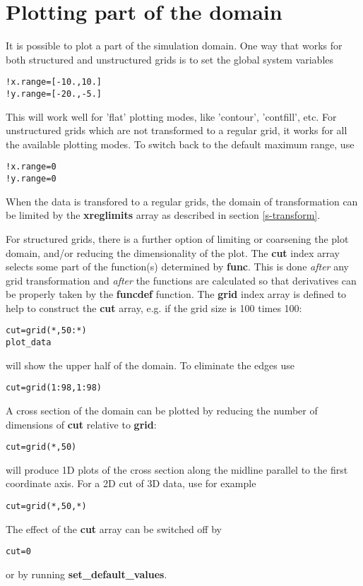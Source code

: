 \documentclass{article}
\begin{document}
\section{Plotting part of the domain \label{s-plot-part}}

It is possible to plot a part of the simulation domain.
One way that works for both structured and unstructured grids is
to set the global system variables
\begin{verbatim}
!x.range=[-10.,10.]
!y.range=[-20.,-5.]
\end{verbatim}
This will work well for 'flat' plotting modes, like 'contour',
'contfill', etc. For unstructured grids which are not transformed
to a regular grid, it works for all the available plotting modes.
To switch back to the default maximum range, use
\begin{verbatim}
!x.range=0
!y.range=0
\end{verbatim}
When the data is transfored to a regular grids, the domain of transformation
can be limited by the {\bf xreglimits} array as described in section
\ref{s-transform}. 

For structured grids, there is a further option of limiting or coarsening
the plot domain, and/or reducing the dimensionality of the plot.
The {\bf cut} index array selects some part of the function(s)
determined by {\bf func}.
This is done {\em after} any grid transformation and {\em after} 
the functions are calculated so that derivatives can be properly taken 
by the {\bf funcdef} function.
The {\bf grid} index array is defined to help to construct
the {\bf cut} array, e.g. if the grid size is 100 times 100:
\begin{verbatim}
cut=grid(*,50:*)
plot_data
\end{verbatim}
will show the upper half of the domain. To eliminate the edges use
\begin{verbatim}
cut=grid(1:98,1:98)
\end{verbatim}
A cross section of the domain can be plotted by reducing
the number of dimensions of {\bf cut} relative to {\bf grid}:
\begin{verbatim}
cut=grid(*,50)
\end{verbatim}
will produce 1D plots of the cross section along the midline parallel to 
the first coordinate axis. For a 2D cut of 3D data, use for example
\begin{verbatim}
cut=grid(*,50,*)
\end{verbatim}
   The effect of the {\bf cut} array can be switched off by 
\begin{verbatim}
cut=0
\end{verbatim}
or by running {\bf set\_default\_values}.
\end{document}
